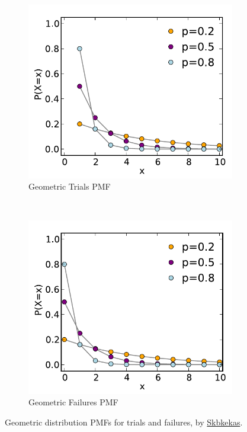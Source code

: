 \begin{figure}
\centering
  \begin{subfigure}[c]{0.475\textwidth}\centering
  \includegraphics[width=\textwidth]{figures/stats/dist/geometric_trials_pmf}
  \caption{Geometric Trials PMF}
  \label{fig:dist:geometric_trials}
  \end{subfigure}
  ~
  \begin{subfigure}[c]{0.48\textwidth}\centering
  \includegraphics[width=\textwidth]{figures/stats/dist/geometric_failures_pmf}
  \caption{Geometric Failures PMF}
  \label{fig:dist:geometric_failures}
  \end{subfigure}
\caption{
Geometric distribution PMFs for trials and failures,
by \href{https://en.wikipedia.org/wiki/File:Geometric_pmf.svg}{Skbkekas}.
\label{fig:dist:geometric}
}
\end{figure}

